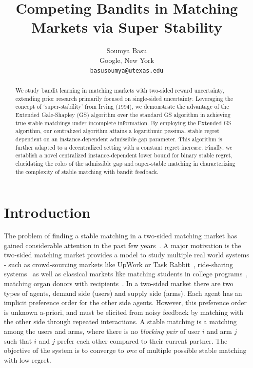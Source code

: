 \documentclass{article}
\title{Competing Bandits in Matching Markets via Super Stability}
\author{
  Soumya Basu \\
  Google, New York
  \\ \texttt{basusoumya@utexas.edu}
}
\begin{document}
\maketitle


\begin{abstract}
We study bandit learning in matching markets with two-sided reward uncertainty, extending prior research primarily focused on single-sided uncertainty. Leveraging the concept of `super-stability' from Irving (1994), we demonstrate the advantage of the Extended Gale-Shapley (GS) algorithm over the standard GS algorithm in achieving true stable matchings under incomplete information. By employing the Extended GS algorithm, our centralized algorithm attains a logarithmic pessimal stable regret dependent on an instance-dependent admissible gap parameter.  This algorithm is further adapted to a decentralized setting with a constant regret increase.  Finally, we establish a novel centralized instance-dependent lower bound for binary stable regret, elucidating the roles of the admissible gap and super-stable matching in characterizing the complexity of stable matching with bandit feedback.
\end{abstract}



\section{Introduction}
The problem of finding a stable matching in a two-sided matching market has gained considerable attention in the past few years~\cite{das2005two,liu_centralized_2020,ucbd3,basu_2021,liu_decentralized_2021,jagadeesan2021learning,hosseini2024putting,avishek_nonstationary}. A major motivation is the two-sided matching market provides a model to study multiple real world systems - such as crowd-sourcing markets like UpWork or Task Rabbit~\cite{li2019three, zhang2023stable}, ride-sharing systems~\cite{johari2021matching} as well as classical markets like matching students in college programs~\cite{gale1962college}, matching organ donors with recipients~\cite{reddy2013matching}. In a two-sided market there are two types of agents, demand side (users) and supply side (arms). Each agent has an implicit preference order for the other side agents. However, this preference order is unknown a-priori, and must be elicited from noisy feedback by matching with the other side through repeated interactions. A stable matching is a matching among the users and arms, where there is no {\em blocking pair} of user $i$ and arm $j$ such that $i$ and $j$ prefer each other compared to their current partner. The objective of the system is to converge to {\em one} of multiple possible stable matching with low regret.  
\end{document}
